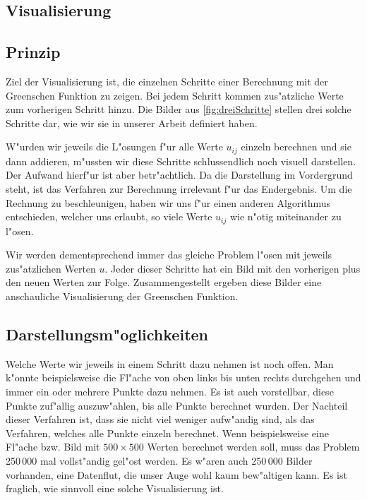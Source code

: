 \begin{refsection}
\section{Visualisierung}
\subsection{Prinzip}
			
Ziel der Visualisierung ist, die einzelnen Schritte einer Berechnung
mit der Greenschen Funktion zu zeigen. Bei jedem Schritt kommen
zus"atzliche Werte zum vorherigen Schritt hinzu. Die Bilder aus
\ref{fig:dreiSchritte} stellen drei solche Schritte dar, wie wir
sie in unserer Arbeit definiert haben.
		
W"urden wir jeweils die L"osungen f"ur alle Werte $u_{ij}$ einzeln
berechnen und sie dann addieren, m"ussten wir diese Schritte
schlussendlich noch visuell darstellen. Der Aufwand hierf"ur ist
aber betr"achtlich. Da die Darstellung im Vordergrund steht, ist das Verfahren zur
Berechnung irrelevant f"ur das Endergebnis. Um die Rechnung zu
beschleunigen, haben wir uns f"ur einen anderen Algorithmus
entschieden, welcher uns erlaubt, so viele Werte $u_{ij}$ wie n"otig
miteinander zu l"osen.
		
Wir werden dementsprechend immer das gleiche Problem l"osen mit
jeweils zus"atzlichen Werten $u$. Jeder dieser Schritte hat ein
Bild mit den vorherigen plus den neuen Werten zur Folge. Zusammengestellt
ergeben diese Bilder eine anschauliche Visualisierung der Greenschen
Funktion.
	
	
\subsection{Darstellungsm"oglichkeiten}
	
Welche Werte wir jeweils in einem Schritt dazu nehmen ist noch
offen. Man k"onnte beispielsweise die Fl"ache von oben links bis
unten rechts durchgehen und immer ein oder mehrere Punkte dazu
nehmen. Es ist auch vorstellbar, diese Punkte zuf"allig auszuw"ahlen,
bis alle Punkte berechnet wurden. Der Nachteil dieser Verfahren
ist, dass sie nicht viel weniger aufw"andig sind, als das Verfahren,
welches alle Punkte einzeln berechnet. Wenn beispielsweise eine
Fl"ache bzw. Bild mit $500 \times 500$ Werten berechnet werden soll,
muss das Problem 250\,000 mal vollst"andig gel"ost werden. Es w"aren
auch 250\,000 Bilder vorhanden, eine Datenflut, die unser Auge wohl
kaum bew"altigen kann. Es ist fraglich, wie sinnvoll eine solche
Visualisierung ist.
		

\end{refsection}
